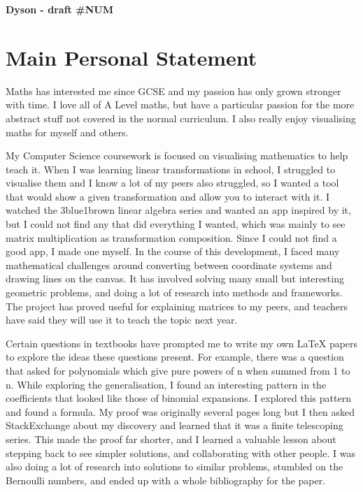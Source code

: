 \documentclass[a4paper, 12pt]{article}
\newenvironment{personalstatement}{\directlua{startPersonalStatement()}}{\directlua{stopPersonalStatement()}}
\begin{document}
\begin{center}
	\vspace*{3mm}
	\huge{\textbf{Dyson - draft \#NUM}}
\end{center}

\setlength{\parskip}{7.5ex}
\setlength{\parindent}{0em}

\vspace*{-12ex} %
\section*{Main Personal Statement}
\vspace*{-6ex}

\begin{personalstatement}
Maths has interested me since GCSE and my passion has only grown stronger with time. I love all of A Level maths, but have a particular passion for the more abstract stuff not covered in the normal curriculum. I also really enjoy visualising maths for myself and others.

My Computer Science coursework is focused on visualising mathematics to help teach it. When I was learning linear transformations in school, I struggled to visualise them and I know a lot of my peers also struggled, so I wanted a tool that would show a given transformation and allow you to interact with it. I watched the 3blue1brown linear algebra series and wanted an app inspired by it, but I could not find any that did everything I wanted, which was mainly to see matrix multiplication as transformation composition. Since I could not find a good app, I made one myself. In the course of this development, I faced many mathematical challenges around converting between coordinate systems and drawing lines on the canvas. It has involved solving many small but interesting geometric problems, and doing a lot of research into methods and frameworks. The project has proved useful for explaining matrices to my peers, and teachers have said they will use it to teach the topic next year.

Certain questions in textbooks have prompted me to write my own LaTeX papers to explore the ideas these questions present. For example, there was a question that asked for polynomials which give pure powers of n when summed from 1 to n. While exploring the generalisation, I found an interesting pattern in the coefficients that looked like those of binomial expansions. I explored this pattern and found a formula. My proof was originally several pages long but I then asked StackExchange about my discovery and learned that it was a finite telescoping series. This made the proof far shorter, and I learned a valuable lesson about stepping back to see simpler solutions, and collaborating with other people. I was also doing a lot of research into solutions to similar problems, stumbled on the Bernoulli numbers, and ended up with a whole bibliography for the paper.


\end{personalstatement}
\end{document}
